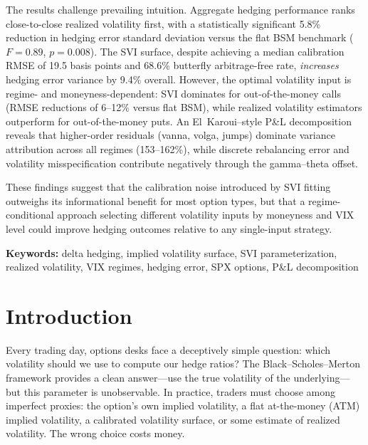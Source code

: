 \documentclass[12pt, letterpaper]{article}
\begin{document}
The results challenge prevailing intuition. Aggregate hedging performance ranks close-to-close realized volatility first, with a statistically significant 5.8\% reduction in hedging error standard deviation versus the flat BSM benchmark ($F = 0.89$, $p = 0.008$). The SVI surface, despite achieving a median calibration RMSE of 19.5 basis points and 68.6\% butterfly arbitrage-free rate, \textit{increases} hedging error variance by 9.4\% overall. However, the optimal volatility input is regime- and moneyness-dependent: SVI dominates for out-of-the-money calls (RMSE reductions of 6--12\% versus flat BSM), while realized volatility estimators outperform for out-of-the-money puts. An El~Karoui--style P\&L decomposition reveals that higher-order residuals (vanna, volga, jumps) dominate variance attribution across all regimes (153--162\%), while discrete rebalancing error and volatility misspecification contribute negatively through the gamma--theta offset.

These findings suggest that the calibration noise introduced by SVI fitting outweighs its informational benefit for most option types, but that a regime-conditional approach selecting different volatility inputs by moneyness and VIX level could improve hedging outcomes relative to any single-input strategy.

\vspace{0.5cm}
\noindent\textbf{Keywords:} delta hedging, implied volatility surface, SVI parameterization, realized volatility, VIX regimes, hedging error, SPX options, P\&L decomposition

\newpage
\tableofcontents
\newpage
\listoftables
\listoffigures
\newpage

\section{Introduction}
\label{sec:introduction}

Every trading day, options desks face a deceptively simple question: which volatility should we use to compute our hedge ratios? The Black--Scholes--Merton framework \citep{Black1973, Merton1973} provides a clean answer---use the true volatility of the underlying---but this parameter is unobservable. In practice, traders must choose among imperfect proxies: the option's own implied volatility, a flat at-the-money (ATM) implied volatility, a calibrated volatility surface, or some estimate of realized volatility. The wrong choice costs money.
\end{document}
